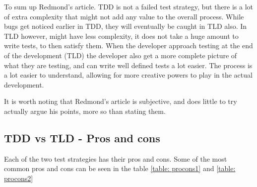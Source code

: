 To sum up Redmond’s article. TDD is not a failed test strategy, but there is a lot of extra complexity that might not add any value to the overall process. While bugs get noticed earlier in TDD, they will eventually be caught in TLD also. In TLD however, might have less complexity, it does not take a huge amount to write tests, to then satisfy them. When the developer approach testing at the end of the development (TLD) the developer also get a more complete picture of what they are testing, and can write well defined tests a lot easier. The process is a lot easier to understand, allowing for more creative powers to play in the actual development.
 
It is worth noting that Redmond’s article is subjective, and does little to try actually argue his points, more so than stating them.  
\subsection{TDD vs TLD - Pros and cons} 

Each of the two test strategies has their pros and cons. Some of the most common pros and cons can be seen 
in the table
\ref{table: procons1} and  \ref{table: procons2}
\begin{center}

\end{center}





